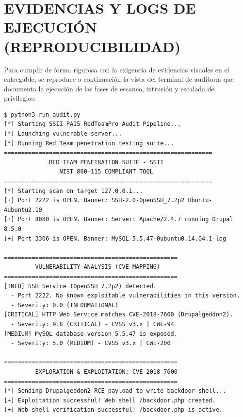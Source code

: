 \documentclass[11pt,a4paper]{article}
\begin{document}
\newpage
\section{EVIDENCIAS Y LOGS DE EJECUCIÓN (REPRODUCIBILIDAD)}

Para cumplir de forma rigurosa con la exigencia de evidencias visuales en el entregable, se reproduce a continuación la vista del terminal de auditoría que documenta la ejecución de las fases de escaneo, intrusión y escalada de privilegios:

\begin{tcolorbox}[
  enhanced,
  colback=black!90!white,
  colframe=black!75!white,
  coltitle=white,
  fonttitle=\ttfamily\small,
  title={Terminal: insegus@pentest-suite (\textasciitilde{}/PAI5)},
  boxrule=1.5pt,
  arc=5pt,
  left=8pt, right=8pt, top=10pt, bottom=10pt,
  overlay={
    \fill[red!80!black] ([xshift=10pt, yshift=-8pt]frame.north west) circle (3.5pt);
    \fill[yellow!80!black] ([xshift=20pt, yshift=-8pt]frame.north west) circle (3.5pt);
    \fill[green!80!black] ([xshift=30pt, yshift=-8pt]frame.north west) circle (3.5pt);
  },
  lefttitle=35pt
]
\begin{verbatim}
$ python3 run_audit.py
[*] Starting SSII PAI5 RedTeamPro Audit Pipeline...
[*] Launching vulnerable server...
[*] Running Red Team penetration testing suite...
============================================================
             RED TEAM PENETRATION SUITE - SSII               
                NIST 800-115 COMPLIANT TOOL                  
============================================================
[*] Starting scan on target 127.0.0.1...
[+] Port 2222 is OPEN. Banner: SSH-2.0-OpenSSH_7.2p2 Ubuntu-4ubuntu2.10
[+] Port 8080 is OPEN. Banner: Server: Apache/2.4.7 running Drupal 8.5.0
[+] Port 3306 is OPEN. Banner: MySQL 5.5.47-0ubuntu0.14.04.1-log

==================================================
         VULNERABILITY ANALYSIS (CVE MAPPING)         
==================================================
[INFO] SSH Service (OpenSSH 7.2p2) detected.
  - Port 2222. No known exploitable vulnerabilities in this version.
  - Severity: 0.0 (INFORMATIONAL)
[CRITICAL] HTTP Web Service matches CVE-2018-7600 (Drupalgeddon2).
  - Severity: 9.8 (CRITICAL) - CVSS v3.x | CWE-94
[MEDIUM] MySQL database version 5.5.47 is exposed.
  - Severity: 5.0 (MEDIUM) - CVSS v3.x | CWE-200

==================================================
         EXPLORATION & EXPLOITATION: CVE-2018-7600    
==================================================
[*] Sending Drupalgeddon2 RCE payload to write backdoor shell...
[+] Exploitation successful! Web shell /backdoor.php created.
[+] Web shell verification successful! /backdoor.php is active.


\end{verbatim}
\end{tcolorbox}
\end{document}
